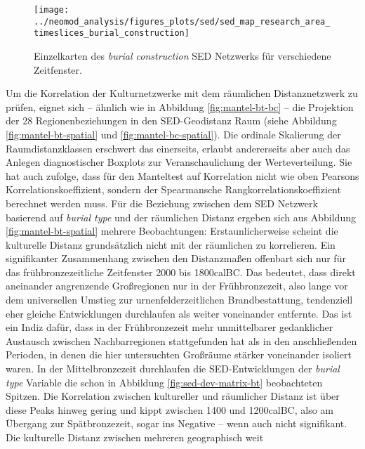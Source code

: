 \documentclass[openany,twoside,twocolumn]{book}
\begin{document}
\begin{landscape}
\begin{figure}
\texttt{[image: ../neomod\_analysis/figures\_plots/sed/sed\_map\_research\_area\_timeslices\_burial\_construction]} \caption[Einzelkarten des \textit{burial construction} SED Netzwerks für verschiedene Zeitfenster]{Einzelkarten des \textit{burial construction} SED Netzwerks für verschiedene Zeitfenster.}\label{fig:map-sed-bc}
\end{figure}
\end{landscape}

Um die Korrelation der Kulturnetzwerke mit dem räumlichen
Distanznetzwerk zu prüfen, eignet sich -- ähnlich wie in Abbildung
\ref{fig:mantel-bt-bc} -- die Projektion der 28 Regionenbeziehungen in
den SED-Geodistanz Raum (siehe Abbildung \ref{fig:mantel-bt-spatial} und
\ref{fig:mantel-bc-spatial}). Die ordinale Skalierung der
Raumdistanzklassen erschwert das einerseits, erlaubt andererseits aber
auch das Anlegen diagnostischer Boxplots zur Veranschaulichung der
Werteverteilung. Sie hat auch zufolge, dass für den Manteltest auf
Korrelation nicht wie oben Pearsons Korrelationskoeffizient, sondern der
Spearmansche Rangkorrelationskoeffizient berechnet werden muss. Für die
Beziehung zwischen dem SED Netzwerk basierend auf \emph{burial type} und
der räumlichen Distanz ergeben sich aus Abbildung
\ref{fig:mantel-bt-spatial} mehrere Beobachtungen: Erstaunlicherweise
scheint die kulturelle Distanz grundsätzlich nicht mit der räumlichen zu
korrelieren. Ein signifikanter Zusammenhang zwischen den Distanzmaßen
offenbart sich nur für das frühbronzezeitliche Zeitfenster 2000 bis
1800calBC. Das bedeutet, dass direkt aneinander angrenzende Großregionen
nur in der Frühbronzezeit, also lange vor dem universellen Umstieg zur
urnenfelderzeitlichen Brandbestattung, tendenziell eher gleiche
Entwicklungen durchlaufen als weiter voneinander entfernte. Das ist ein
Indiz dafür, dass in der Frühbronzezeit mehr unmittelbarer gedanklicher
Austausch zwischen Nachbarregionen stattgefunden hat als in den
anschließenden Perioden, in denen die hier untersuchten Großräume
stärker voneinander isoliert waren. In der Mittelbronzezeit durchlaufen
die SED-Entwicklungen der \emph{burial type} Variable die schon in
Abbildung \ref{fig:sed-dev-matrix-bt} beobachteten Spitzen. Die
Korrelation zwischen kultureller und räumlicher Distanz ist über diese
Peaks hinweg gering und kippt zwischen 1400 und 1200calBC, also am
Übergang zur Spätbronzezeit, sogar ins Negative -- wenn auch nicht
signifikant. Die kulturelle Distanz zwischen mehreren geographisch weit
\end{document}
